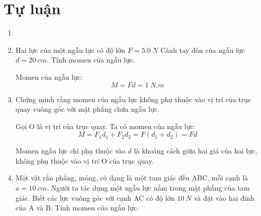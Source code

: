 \section{Tự luận}
\begin{enumerate}[label=\bfseries Câu \arabic*:]
	\item {}
	
	
	
	\item {}
	
	\cauhoi
	{Hai lực của một ngẫu lực có độ lớn  $F=\SI{5.0}{N}$ Cánh tay đòn của ngẫu lực $d=\SI{20}{cm}$. Tính momen của ngẫu lực.
	}
	
	\loigiai
	{
	Momen của ngẫu lực:
	$$M=Fd = \SI{1}{N.m}$$
	}
	\item {}
	
	\cauhoi
	{Chứng minh rằng momen của ngẫu lực không phụ thuộc vào vị trí của trục quay vuông góc với mặt phẳng chứa ngẫu lực.
	}
	
	\loigiai
	{Gọi O là vị trí của trục quay. Ta có momen của ngẫu lực:
		$$M=F_1d_1 + F_2d_2 = F (d_1 + d_2) = Fd$$
		
	Momen ngẫu lực chỉ phụ thuộc vào $d$ là khoảng cách giữa hai giá của hai lực, không phụ thuộc vào vị trí O của trục quay.
	}
	\item {}
	
	\cauhoi
	{Một vật rắn phẳng, mỏng, có dạng là một tam giác đều ABC, mỗi cạnh là $a=\SI{10}{cm}$. Người ta tác dụng một ngẫu lực nằm trong mặt phẳng của tam giác. Biết các lực vuông góc với cạnh AC có độ lớn $\SI{10}{N}$ và đặt vào hai đỉnh của A và B. Tính momen của ngẫu lực.
	}
	

\end{enumerate}
